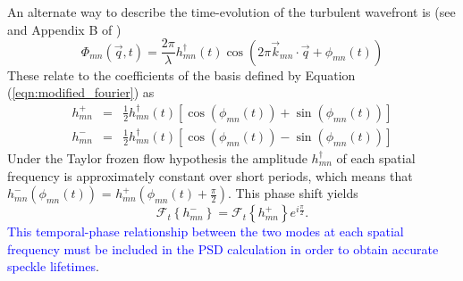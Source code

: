 \documentclass[10pt,preprint]{aastex631}
\newcommand{\jrmadd}[1]{\textcolor{blue}{#1}}
\begin{document}
An alternate way to describe the time-evolution of the turbulent wavefront is (see \citet{2005ApJ...629..592G} and Appendix B of \citet{2018JATIS...4a9001M})
\begin{equation}
\Phi_{mn}(\vec{q},t) = \frac{2\pi}{\lambda} h_{mn}^\dagger(t) \cos \left( 2\pi \vec{k}_{mn} \cdot \vec{q} + \phi_{mn}(t) \right)
\end{equation}
These relate to the coefficients of the basis defined by Equation (\ref{eqn:modified_fourier}) as
\begin{eqnarray}
h_{mn}^+ &=& \frac{1}{2} h_{mn}^\dagger(t) \left[ \cos(\phi_{mn}(t)) + \sin(\phi_{mn}(t))\right] \\
h_{mn}^- &=& \frac{1}{2} h_{mn}^\dagger(t) \left[ \cos(\phi_{mn}(t)) - \sin(\phi_{mn}(t))\right] \nonumber
\end{eqnarray}
Under the Taylor frozen flow hypothesis the amplitude $h_{mn}^\dagger$ of each spatial frequency is approximately constant over short periods, which means that $h_{mn}^-(\phi_{mn}(t))$ = $h_{mn}^+(\phi_{mn}(t) + \frac{\pi}{2})$.  This phase shift yields
\begin{equation}
\mathcal{F}_t\left\{h_{mn}^-\right\} = \mathcal{F}_t\left\{h_{mn}^+\right\} e^{i\frac{\pi}{2}}.
\end{equation}
\jrmadd{This temporal-phase relationship between the two modes at each spatial frequency must be included in the PSD calculation in order to obtain accurate speckle lifetimes}.
\end{document}
